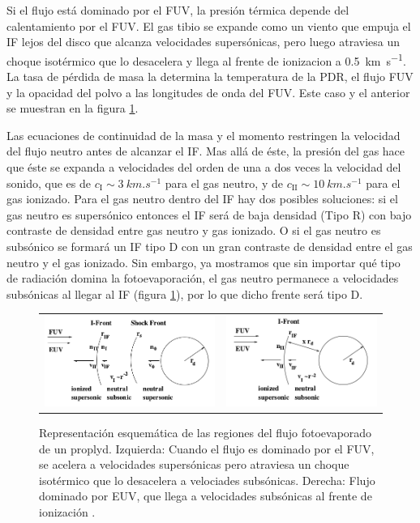 Si el flujo está dominado por el FUV, la presión térmica depende del calentamiento por el FUV. El gas tibio se expande como un viento que empuja el IF lejos del disco que alcanza velocidades supersónicas, pero luego atraviesa un choque isotérmico que lo desacelera y llega al frente de ionizacion a \SI{0.5}{km.s^{-1}}. La tasa de pérdida de masa la determina la temperatura de la PDR, el flujo FUV y la opacidad del polvo a las longitudes de onda del FUV. Este caso y el anterior se muestran en la figura \ref{fig:EUV-FUV-IF}.

Las ecuaciones de continuidad de la masa y el momento restringen la velocidad del flujo neutro antes de alcanzar el IF. Mas allá de éste, la presión del gas hace que éste se expanda a velocidades del orden de una a dos veces la velocidad del sonido, que es de $c_{\mathrm{I}} \sim \SI{3}{km.s^{-1}}$ para el gas neutro, y de $c_{\mathrm{II}} \sim \SI{10}{km.s^{-1}}$ para el gas ionizado. Para el gas neutro dentro del IF hay dos posibles soluciones: si el gas neutro es supersónico entonces el IF será de baja densidad (Tipo R) con bajo contraste de densidad entre gas neutro y gas ionizado. O si el gas neutro es subsónico se formará un IF tipo D con un gran contraste de densidad entre el gas neutro y el gas ionizado. Sin embargo, ya mostramos que sin importar qué tipo de radiación domina la fotoevaporación, el gas neutro permanece a velocidades subsónicas al llegar al IF (figura \ref{fig:EUV-FUV-IF}), por lo que dicho frente será tipo D.

\begin{figure}
  \centering
    \begin{tabular}{cc}
      \includegraphics[width=0.5\linewidth]{./Figures/Johnstone-2} &
      \includegraphics[width=0.5\linewidth]{./Figures/Johnstone-3}
    \end{tabular}
    \caption[Representación esquemática del flujo fotoevaporado]{Representación esquemática de las regiones del flujo fotoevaporado de un proplyd. Izquierda: Cuando el flujo es dominado por el FUV, se acelera a velocidades supersónicas pero atraviesa un choque isotérmico que lo desacelera a velociades subsónicas. Derecha: Flujo dominado por EUV, que llega a velocidades subsónicas al frente de ionización \citep{Johnstone:1998}.}
    \label{fig:EUV-FUV-IF}
  \end{figure}
  
